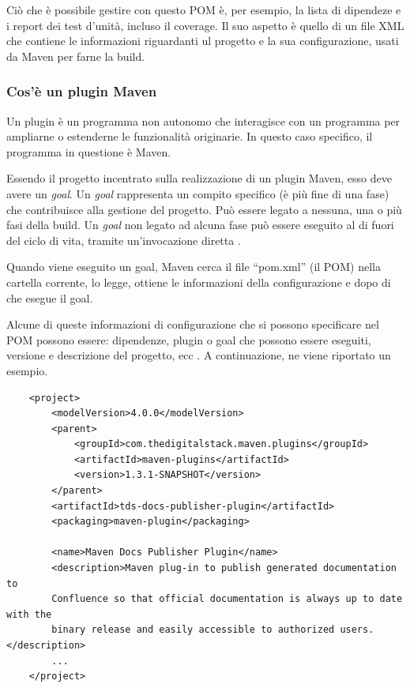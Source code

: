 
    Ciò che è possibile gestire con questo POM è, per esempio, la lista di dipendeze e i report dei test d'unità, incluso il coverage.
    Il suo aspetto è quello di un file XML che contiene le informazioni riguardanti ul progetto e la sua configurazione, usati da Maven per farne la build.

    \subsubsection{Cos'è un plugin Maven}

    Un plugin è un programma non autonomo che interagisce con un programma per ampliarne o estenderne le funzionalità originarie.
    In questo caso specifico, il programma in questione è Maven.

    Essendo il progetto incentrato sulla realizzazione di un plugin Maven, esso deve avere un \emph{goal}.
    Un \emph{goal} rappresenta un compito specifico (è più fine di una fase) che contribuisce alla gestione del progetto.
    Può essere legato a nessuna, una o più fasi della build.
    Un \emph{goal} non legato ad alcuna fase può essere eseguito al di fuori del ciclo di vita, tramite un'invocazione diretta \cite{site:maven-plugin}.


    Quando viene eseguito un goal, Maven cerca il file ``pom.xml'' (il POM) nella cartella corrente, lo legge, ottiene le informazioni della configurazione e dopo di che esegue il goal.

    Alcune di queste informazioni di configurazione che si possono specificare nel POM possono essere: dipendenze, plugin o goal che possono essere eseguiti, versione e descrizione del progetto, ecc \cite{site:maven-pom}.
    A continuazione, ne viene riportato un esempio.


    \begin{lstlisting} 
    <project>
        <modelVersion>4.0.0</modelVersion>
        <parent>
            <groupId>com.thedigitalstack.maven.plugins</groupId>
            <artifactId>maven-plugins</artifactId>
            <version>1.3.1-SNAPSHOT</version>
        </parent>
        <artifactId>tds-docs-publisher-plugin</artifactId>
        <packaging>maven-plugin</packaging>

        <name>Maven Docs Publisher Plugin</name>
        <description>Maven plug-in to publish generated documentation to 
        Confluence so that official documentation is always up to date with the 
        binary release and easily accessible to authorized users.</description>
        ...
    </project>  
    \end{lstlisting}
    
